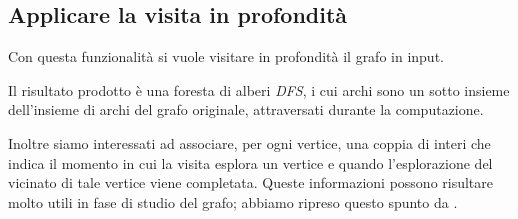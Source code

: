 \subsection{Applicare la visita in profondit\`a}
Con questa funzionalit\`a si vuole visitare in profondit\`a il grafo
in input.

Il risultato prodotto \`e una foresta di alberi \emph{DFS}, i cui
archi sono un sotto insieme dell'insieme di archi del grafo originale,
attraversati durante la computazione.

Inoltre siamo interessati ad associare, per ogni vertice, una coppia
di interi che indica il momento in cui la visita esplora un vertice e
quando l'esplorazione del vicinato di tale vertice viene
completata. Queste informazioni possono risultare molto utili in fase
di studio del grafo; abbiamo ripreso questo spunto da
\cite{Algorithms}.

